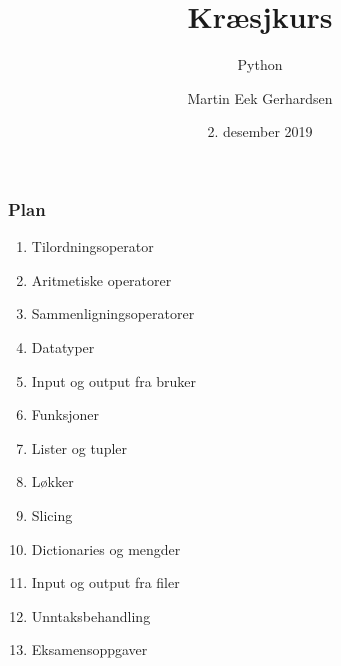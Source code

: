 \documentclass[screen, aspectratio=43]{beamer}
\title[Kræsjkurs]{Kræsjkurs}
\subtitle{Python}
\author[M. E. Gerhardsen]{Martin Eek Gerhardsen}
\institute[NTNU]{Institutt for Teknisk Kybernetikk, NTNU}
\date{2. desember 2019}
\begin{document}
\begin{frame} 
\titlepage
\end{frame} 

\begin{frame}
    \frametitle{Plan}

    \begin{enumerate}
        \item Tilordningsoperator
        \item Aritmetiske operatorer
        \item Sammenligningsoperatorer
        \item Datatyper
        \item Input og output fra bruker
        \item Funksjoner 
        \item Lister og tupler
        \item Løkker 
        \item Slicing 
        \item Dictionaries og mengder 
        \item Input og output fra filer 
        \item Unntaksbehandling
        \item Eksamensoppgaver
    \end{enumerate}

\end{frame}

% 
% 
% 
% 
% 
% 
% 
% 
% 
% 
% 

\end{document}
